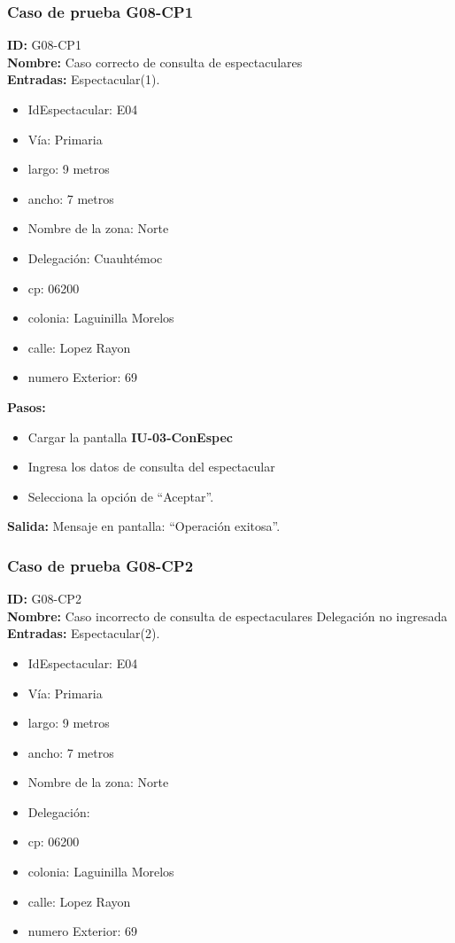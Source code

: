 \subsubsection{Caso de prueba G08-CP1}
\textbf{ID:} G08-CP1\\
\textbf{Nombre:} Caso correcto de consulta de espectaculares\\
\textbf{Entradas:}
Espectacular(1). 
\begin{itemize}
    \item IdEspectacular: E04
    \item Vía: Primaria
    \item largo: 9 metros
    \item ancho: 7 metros
    \item Nombre de la zona: Norte
    \item Delegación: Cuauhtémoc
    \item cp: 06200
    \item colonia: Laguinilla Morelos
    \item calle: Lopez Rayon
    \item numero Exterior: 69
\end{itemize}

\textbf{Pasos:}
\begin{itemize}
    \item Cargar la pantalla \textbf{IU-03-ConEspec}
    \item Ingresa los datos de consulta del espectacular
    \item Selecciona la opción de ``Aceptar''.
\end{itemize}
\textbf{Salida:}
Mensaje en pantalla: ``Operación exitosa''.


\subsubsection{Caso de prueba G08-CP2}
\textbf{ID:} G08-CP2\\
\textbf{Nombre:} Caso incorrecto de consulta de espectaculares Delegación no ingresada\\
\textbf{Entradas:}
Espectacular(2). 
\begin{itemize}
    \item IdEspectacular: E04
    \item Vía: Primaria
    \item largo: 9 metros
    \item ancho: 7 metros
    \item Nombre de la zona: Norte
    \item Delegación: 
    \item cp: 06200
    \item colonia: Laguinilla Morelos
    \item calle: Lopez Rayon
    \item numero Exterior: 69
\end{itemize}


